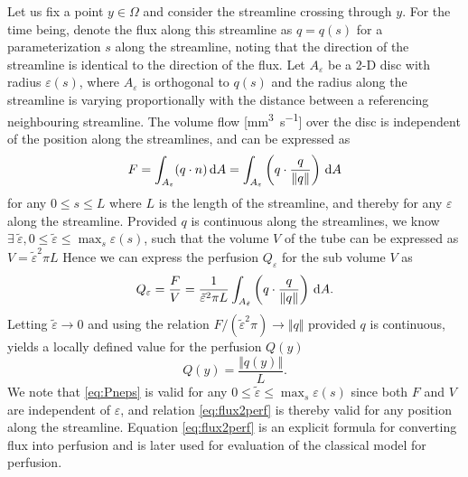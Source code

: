 \documentclass[paper=a4, fontsize=11pt,parskip=half,headings=small]{scrartcl}
\newcommand{\Perf}{Q}
\newcommand{\siFmm}{\milli\meter\cubed\per\second}
\begin{document}
	Let us fix a point $y \in \Omega$ and consider the streamline crossing through $y$. For the time being, denote the flux along this streamline as $q = q(s)$ for a parameterization $s$ along the streamline, noting that the direction of the streamline is identical to the direction of the flux.
	Let $A_\varepsilon$ be a 2-D disc with radius $\varepsilon(s)$, where  $A_\varepsilon$ is orthogonal to $q(s)$ and the radius along the streamline is varying proportionally with the distance between a referencing neighbouring streamline. 
	The volume flow [\si{\siFmm}] over the disc is independent of the position along the streamlines, and can be expressed as
	\begin{equation}
		F = \int_{A_\varepsilon} (q \cdot n) \,\mathrm{d} A = \int_{A_\varepsilon} \left(q\cdot \frac{q}{\Vert q \Vert}\right) \,\mathrm{d} A
	\end{equation}
	for any $0 \leq s \leq L$ where $L$ is the length of the streamline, and thereby for any $\varepsilon$ along the streamline.
	Provided $q$ is continuous along the streamlines, we know $\exists ~ \tilde{\varepsilon}, 0 \leq \tilde{\varepsilon} \leq \max_s \varepsilon(s)$, such that the volume $V$ of the tube can be expressed as $V = \tilde{\varepsilon}^2\pi L$
	Hence we can express the perfusion $\Perf_{\varepsilon}$ for the sub volume $V$ as
	\begin{equation}
		\Perf_\varepsilon = \frac{F}{V} = \frac{1}{\tilde{\varepsilon}^2 \pi L} \int_{A_{\tilde{\varepsilon}}} \left( q\cdot \frac{q}{\Vert q \Vert} \right) \diffint A. 
		\label{eq:Pneps}
	\end{equation}
	Letting $\tilde{\varepsilon} \to 0$ and using the relation $F/(\tilde{\varepsilon}^2\pi) \rightarrow \Vert q \Vert$ provided $q$ is continuous, yields a locally defined value for the perfusion $\Perf (y)$
	\begin{equation}
		\Perf(y) = \frac{\Vert q(y) \Vert}{L}.
		\label{eq:flux2perf}
	\end{equation}
	We note that \eqref{eq:Pneps} is valid for any $0 \leq \tilde{\varepsilon} \leq \max_s \varepsilon(s)$ since both $F$ and $V$ are independent of $\varepsilon$, and relation \eqref{eq:flux2perf} is thereby valid for any position along the streamline.
	Equation \eqref{eq:flux2perf} is an explicit formula for converting flux into perfusion and is later used for evaluation of the classical model for perfusion. 
	
\end{document}
